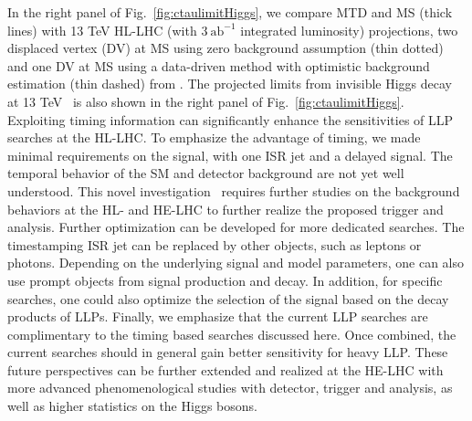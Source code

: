 In the right panel of Fig.~\ref{fig:ctaulimitHiggs}, we compare MTD and MS (thick lines) with 13 TeV  HL-LHC (with $3 ~\text{ab}^{-1}$ integrated luminosity) projections, two displaced vertex (DV) at 
MS using zero background assumption (thin dotted) and one DV at MS using a data-driven method with optimistic background estimation (thin dashed) from \cite{Coccaro:2016lnz}. 
The projected limits from invisible Higgs decay at 13 TeV~\cite{Bernaciak:2014pna} is also shown in the right panel of Fig.~\ref{fig:ctaulimitHiggs}. \\

Exploiting timing information can significantly enhance 
the sensitivities of LLP searches at the HL-LHC. 
To emphasize the advantage of timing, we made minimal requirements on the signal, with one ISR jet
and a delayed signal. 
The temporal behavior of the SM and detector background are not yet well understood. This novel investigation~\cite{Liu:2018wte} requires further studies on the background behaviors at the HL- and HE-LHC to further realize the proposed trigger and analysis.
Further optimization can be developed for more dedicated searches. 
The timestamping ISR jet can be replaced by other objects, such as leptons or photons. Depending on the underlying signal 
and model parameters, one can also use prompt objects from signal production and decay. In addition, for specific searches, 
one could also optimize the selection of the signal based on the decay products of LLPs. 
Finally, we emphasize that the current LLP searches are complimentary to the timing based searches discussed here. Once combined,
the current searches should in general gain better sensitivity for heavy LLP. These future perspectives can be further extended and realized at the HE-LHC with more advanced phenomenological studies with detector, trigger and analysis, as well as higher statistics on the Higgs bosons.


